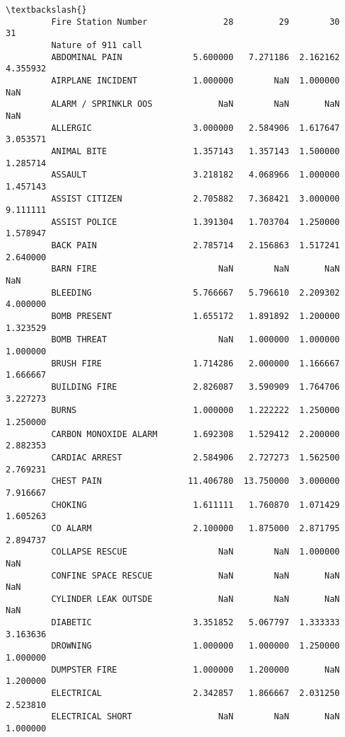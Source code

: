 \documentclass[11pt]{article}
\begin{document}
\begin{Verbatim}[commandchars=\\\{\}]
                                                                               \textbackslash{}
         Fire Station Number               28         29        30         31   
         Nature of 911 call                                                     
         ABDOMINAL PAIN              5.600000   7.271186  2.162162   4.355932   
         AIRPLANE INCIDENT           1.000000        NaN  1.000000        NaN   
         ALARM / SPRINKLR OOS             NaN        NaN       NaN        NaN   
         ALLERGIC                    3.000000   2.584906  1.617647   3.053571   
         ANIMAL BITE                 1.357143   1.357143  1.500000   1.285714   
         ASSAULT                     3.218182   4.068966  1.000000   1.457143   
         ASSIST CITIZEN              2.705882   7.368421  3.000000   9.111111   
         ASSIST POLICE               1.391304   1.703704  1.250000   1.578947   
         BACK PAIN                   2.785714   2.156863  1.517241   2.640000   
         BARN FIRE                        NaN        NaN       NaN        NaN   
         BLEEDING                    5.766667   5.796610  2.209302   4.000000   
         BOMB PRESENT                1.655172   1.891892  1.200000   1.323529   
         BOMB THREAT                      NaN   1.000000  1.000000   1.000000   
         BRUSH FIRE                  1.714286   2.000000  1.166667   1.666667   
         BUILDING FIRE               2.826087   3.590909  1.764706   3.227273   
         BURNS                       1.000000   1.222222  1.250000   1.250000   
         CARBON MONOXIDE ALARM       1.692308   1.529412  2.200000   2.882353   
         CARDIAC ARREST              2.584906   2.727273  1.562500   2.769231   
         CHEST PAIN                 11.406780  13.750000  3.000000   7.916667   
         CHOKING                     1.611111   1.760870  1.071429   1.605263   
         CO ALARM                    2.100000   1.875000  2.871795   2.894737   
         COLLAPSE RESCUE                  NaN        NaN  1.000000        NaN   
         CONFINE SPACE RESCUE             NaN        NaN       NaN        NaN   
         CYLINDER LEAK OUTSDE             NaN        NaN       NaN        NaN   
         DIABETIC                    3.351852   5.067797  1.333333   3.163636   
         DROWNING                    1.000000   1.000000  1.250000   1.000000   
         DUMPSTER FIRE               1.000000   1.200000       NaN   1.200000   
         ELECTRICAL                  2.342857   1.866667  2.031250   2.523810   
         ELECTRICAL SHORT                 NaN        NaN       NaN   1.000000   

\end{Verbatim}
\end{document}
